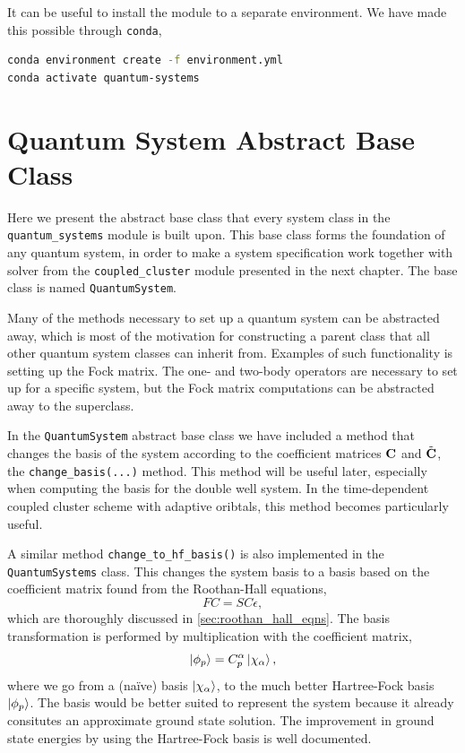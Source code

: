 It can be useful to install the module to a separate environment. We have made this 
possible through \lstinline{conda},
\begin{lstlisting}[language=bash]
conda environment create -f environment.yml
conda activate quantum-systems    
\end{lstlisting}

\section{Quantum System Abstract Base Class} 

Here we present the abstract base class that every system class in the
\lstinline{quantum_systems} module is built upon. This base class forms the foundation 
of any quantum system, in order to make a system specification work together with 
solver from the \lstinline{coupled_cluster} module presented in the next chapter. The base class is 
named \lstinline{QuantumSystem}.

\begin{figure}[h]

\end{figure}

Many of the methods necessary to set up a quantum system can be abstracted away, which 
is most of the motivation for constructing a parent class that all other 
quantum system classes can inherit from. Examples of such functionality is 
setting up the Fock matrix. The one- and two-body operators are necessary to set up 
for a specific system, but the Fock matrix computations can be abstracted away 
to the superclass.

In the \lstinline{QuantumSystem} abstract base class we have included a
method that changes the basis of the system according to the coefficient matrices 
$\vb{C}$ and $\tilde{\vb{C}}$, the \lstinline{change_basis(...)} method.
This method will be useful later, especially when 
computing the basis for the double well system. In the time-dependent coupled cluster 
scheme with adaptive oribtals, this method becomes particularly useful. 

A similar method \lstinline{change_to_hf_basis()} is also implemented in the 
\lstinline{QuantumSystems} class. This changes the system basis to a basis based 
on the coefficient matrix found from the Roothan-Hall equations,
\begin{equation}
    FC = SC\epsilon,
\end{equation}
which are thoroughly discussed in \autoref{sec:roothan_hall_eqns}.
The basis transformation is performed by multiplication with the coefficient matrix,
\begin{equation}
    \ket{\phi_p} = C^\alpha_p \ket{\chi_\alpha},
\end{equation}
where we go from a (naïve) basis $\ket{\chi_\alpha}$, to the much better Hartree-Fock basis 
$\ket{\phi_p}$. The basis would be better suited to represent the system because it 
already consitutes an approximate ground state solution. The improvement in ground state 
energies by using the Hartree-Fock basis is well
documented\cite{jorgensen2011many,lohne2010coupled}.

